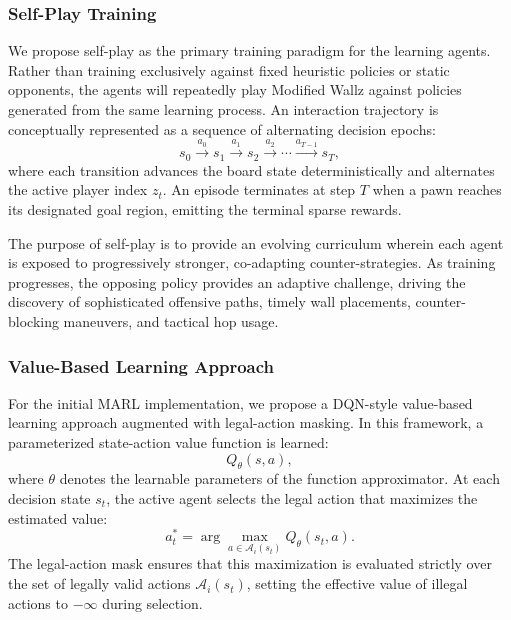 \documentclass{article}
\begin{document}
\subsubsection{Self-Play Training}
\label{subsubsec:self_play}

We propose self-play as the primary training paradigm for the learning agents. Rather than training exclusively against fixed heuristic policies or static opponents, the agents will repeatedly play Modified Wallz against policies generated from the same learning process. An interaction trajectory is conceptually represented as a sequence of alternating decision epochs:
\begin{equation}
s_0 \xrightarrow{a_0} s_1 \xrightarrow{a_1} s_2 \xrightarrow{a_2} \cdots \xrightarrow{a_{T-1}} s_T,
\end{equation}
where each transition advances the board state deterministically and alternates the active player index $z_t$. An episode terminates at step $T$ when a pawn reaches its designated goal region, emitting the terminal sparse rewards.

The purpose of self-play is to provide an evolving curriculum wherein each agent is exposed to progressively stronger, co-adapting counter-strategies. As training progresses, the opposing policy provides an adaptive challenge, driving the discovery of sophisticated offensive paths, timely wall placements, counter-blocking maneuvers, and tactical hop usage.

\subsubsection{Value-Based Learning Approach}
\label{subsubsec:value_based_approach}

For the initial MARL implementation, we propose a DQN-style value-based learning approach augmented with legal-action masking. In this framework, a parameterized state-action value function is learned:
\begin{equation}
Q_\theta(s, a),
\end{equation}
where $\theta$ denotes the learnable parameters of the function approximator. At each decision state $s_t$, the active agent selects the legal action that maximizes the estimated value:
\begin{equation}
a_t^* = \arg\max_{a \in \mathcal{A}_i(s_t)} Q_\theta(s_t, a).
\end{equation}
The legal-action mask ensures that this maximization is evaluated strictly over the set of legally valid actions $\mathcal{A}_i(s_t)$, setting the effective value of illegal actions to $-\infty$ during selection.
\end{document}
